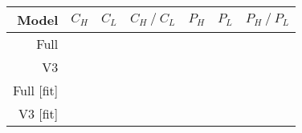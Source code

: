 \begin{tabularx}{0.7\linewidth}{r *{6}{Y}}
	\toprule
  Model & $C_H$ & $C_L$ & $C_H~/~C_L$ & $P_H$ & $P_L$ & $P_H~/~P_L$\\\midrule
  Full &
    
  & 
  & 
  & 
  & 
  & \textbf{}\\
  V3 &
    
  & 
  & 
  & 
  & 
  & \textbf{}\\
  Full [fit] &
    
  & 
  & \textbf{}
  & 
  & 
  & \\
  V3 [fit] &
    
  & 
  & \textbf{}
  & 
  & 
  & \\
  \bottomrule
\end{tabularx}